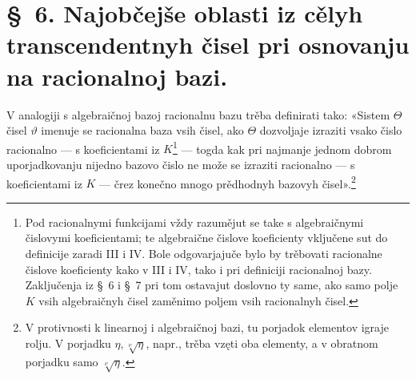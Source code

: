 \documentclass[11pt]{article}
\begin{document}
\section*{\S\ 6. Najobčejše oblasti iz cělyh transcendentnyh čisel pri osnovanju na racionalnoj bazi.}

V analogiji s algebraičnoj bazoj racionalnu bazu trěba definirati tako:
«Sistem $\Theta$ čisel $\vartheta$ imenuje se racionalna baza vsih čisel, ako
$\Theta$ dozvoljaje izraziti vsako čislo racionalno --- s koeficientami iz
$K$\footnote{Pod racionalnymi funkcijami vždy razumějut se take s algebraičnymi
čislovymi koeficientami; te algebraične čislove koeficienty vključene sut do
definicije zaradi III i IV. Bole odgovarjajuče bylo by trěbovati racionalne
čislove koeficienty kako v III i IV, tako i pri definiciji racionalnoj bazy.
Zaključenja iz \S\ 6 i \S\ 7 pri tom ostavajut doslovno ty same, ako samo polje
$K$ vsih algebraičnyh čisel zaměnimo poljem vsih racionalnyh čisel.} --- togda
kak pri najmanje jednom dobrom uporjadkovanju nijedno bazovo čislo ne može se
izraziti racionalno --- s koeficientami iz $K$ --- črez konečno mnogo
prědhodnyh bazovyh čisel».\footnote{V protivnosti k linearnoj i algebraičnoj
bazi, tu porjadok elementov igraje rolju. V porjadku
$\eta,\sqrt[\nu]{\eta}$, napr., trěba vzęti oba elementy, a v obratnom porjadku
samo $\sqrt[\nu]{\eta}$.}
\end{document}

